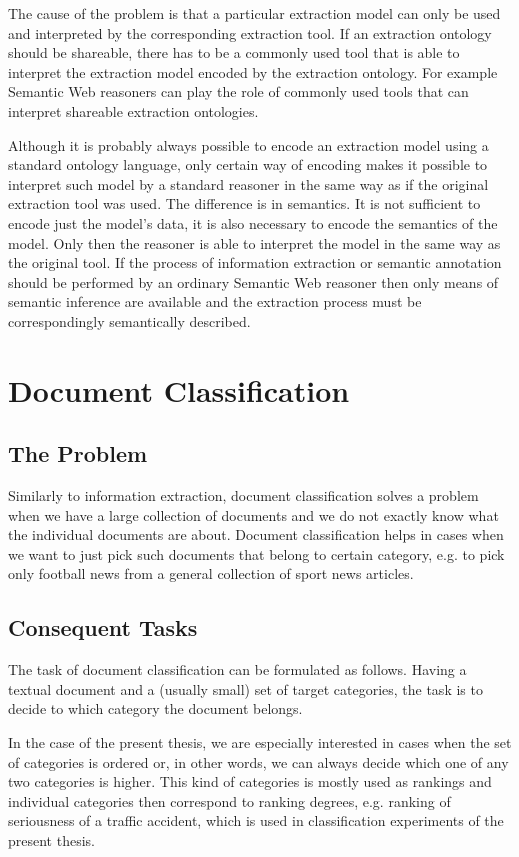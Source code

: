 The cause of the problem is that a particular extraction model can only be used and interpreted by the corresponding extraction tool. If an extraction ontology should be shareable, there has to be a commonly used tool that is able to interpret the extraction model encoded by the extraction ontology. For example Semantic Web reasoners can play the role of commonly used tools that can interpret shareable extraction ontologies.



Although it is probably always possible to encode an extraction model using a standard ontology language, only certain way of encoding makes it possible to interpret such model by a standard reasoner in the same way as if the original extraction tool was used. The difference is in semantics. It is not sufficient to encode just the model's data, it is also necessary to encode the semantics of the model. Only then the reasoner is able to interpret the model in the same way as the original tool. If the process of information extraction or semantic annotation should be performed by an ordinary Semantic Web reasoner then only means of semantic inference are available and the extraction process must be correspondingly semantically described.

\section{Document Classification}

\subsection{The Problem}

Similarly to information extraction, document classification solves a problem when we have a large collection of documents and we do not exactly know what the individual documents are about. Document classification helps in cases when we want to just pick such documents that belong to certain category, e.g. to pick only football news from a general collection of sport news articles. 

\subsection{Consequent Tasks}

The task of document classification can be formulated as follows. Having a textual document and a (usually small) set of target categories, the task is to decide to which category the document belongs. 

In the case of the present thesis, we are especially interested in cases when the set of categories is ordered or, in other words, we can always decide which one of any two categories is higher. This kind of categories is mostly used as rankings and individual categories then correspond to ranking degrees, e.g. ranking of seriousness of a traffic accident, which is used in classification experiments of the present thesis.
